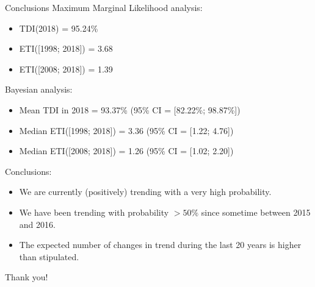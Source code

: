 \documentclass[ignorenonframetext,xcolor=pdflatex,table,dvipsnames,serif]{beamer}
\begin{document}
\begin{frame}{Conclusions}
Maximum Marginal Likelihood analysis:
{\footnotesize
\begin{itemize}
  \item{TDI(2018) = 95.24\%}
  \item{ETI([1998; 2018]) = 3.68}
  \item{ETI([2008; 2018]) = 1.39}
\end{itemize}
}

Bayesian analysis:
{\footnotesize
\begin{itemize}
  \item{Mean TDI in 2018 = 93.37\% (95\% CI = [82.22\%; 98.87\%])}
  \item{Median ETI([1998; 2018]) = 3.36 (95\% CI = [1.22; 4.76])}
  \item{Median ETI([2008; 2018]) = 1.26 (95\% CI = [1.02; 2.20])}
\end{itemize}
}

\pause

\alert{Conclusions:}
{\footnotesize
\begin{itemize}
  \item{We are currently (positively) trending with a very high probability.}
  \item{We have been trending with probability $> 50\%$ since sometime between 2015 and 2016.}
  \item{The expected number of changes in trend during the last 20 years is higher than stipulated.}
\end{itemize}
}
\end{frame}

\begin{frame}
\center \Huge Thank you!
\end{frame}
\end{document}

